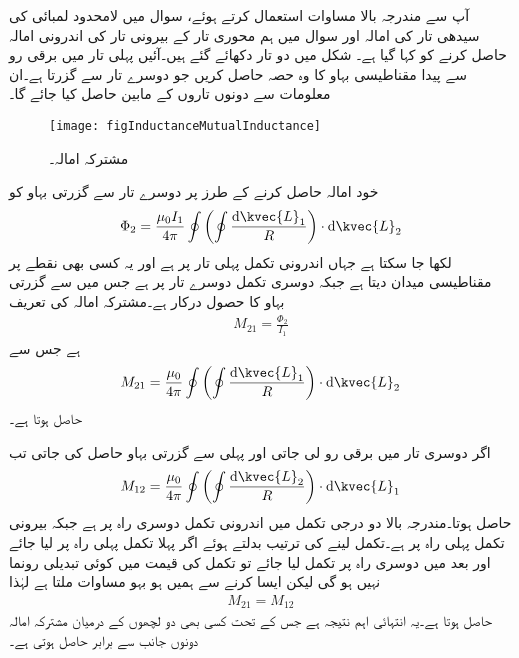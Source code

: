 آپ سے مندرجہ بالا مساوات استعمال کرتے  ہوئے، سوال  میں لامحدود لمبائی کی سیدھی تار کی امالہ اور سوال  میں ہم محوری تار کے بیرونی تار کی اندرونی امالہ حاصل کرنے کو کہا گیا ہے۔
شکل  میں دو تار دکھائے گئے ہیں۔آئیں پہلی تار میں برقی رو  سے پیدا مقناطیسی بہاو کا وہ حصہ حاصل کریں جو  دوسرے تار سے گزرتا ہے۔ان معلومات سے دونوں تاروں  کے مابین  حاصل کیا جائے گا۔
\begin{figure}
\centering
\texttt{[image: figInductanceMutualInductance]}
\caption{مشترکہ امالہ۔}
\label{مساوات_امالہ_مشترکہ_امالہ}
\end{figure}
خود امالہ حاصل کرنے کے  طرز پر دوسرے تار سے گزرتی بہاو کو 
\begin{align*}
\Phi_{2} =\frac{\mu_0 I_1}{4\pi} \oint \left(\oint \frac{\dif \kvec{L}_1}{R} \right) \cdot \dif \kvec{L}_2
\end{align*}
لکھا جا سکتا ہے جہاں اندرونی تکمل پہلی تار پر ہے اور یہ کسی بھی نقطے پر مقناطیسی میدان دیتا ہے جبکہ دوسری تکمل دوسرے تار پر ہے جس میں سے گزرتی بہاو کا حصول درکار ہے۔مشترکہ امالہ  کی تعریف
\begin{align}
M_{21}=\frac{\Phi_2}{I_1}
\end{align}
ہے جس سے
\begin{align}\label{مساوات_امالہ_مشترکہ_الف}
M_{21}=\frac{\mu_0}{4\pi} \oint \left(\oint \frac{\dif \kvec{L}_1}{R} \right) \cdot \dif \kvec{L}_2
\end{align}
حاصل ہوتا ہے۔

اگر دوسری تار میں برقی رو لی جاتی اور پہلی سے گزرتی بہاو حاصل کی جاتی تب
\begin{align}
M_{12}=\frac{\mu_0}{4\pi} \oint \left(\oint \frac{\dif \kvec{L}_2}{R} \right) \cdot \dif \kvec{L}_1
\end{align}
حاصل ہوتا۔مندرجہ بالا دو درجی تکمل میں اندرونی تکمل دوسری راہ پر ہے جبکہ بیرونی تکمل پہلی راہ پر ہے۔تکمل لینے کی ترتیب بدلتے ہوئے اگر پہلا تکمل پہلی راہ پر لیا جائے اور بعد میں دوسری راہ پر تکمل لیا جائے تو تکمل کی قیمت میں کوئی تبدیلی رونما نہیں ہو گی لیکن ایسا کرنے سے ہمیں ہو بہو مساوات  ملتا ہے  لہٰذا 
\begin{align}
M_{21}=M_{12}
\end{align}
حاصل ہوتا ہے۔یہ انتہائی اہم نتیجہ ہے جس کے تحت کسی بھی دو لچھوں کے درمیان مشترکہ امالہ دونوں جانب سے برابر حاصل ہوتی ہے۔




